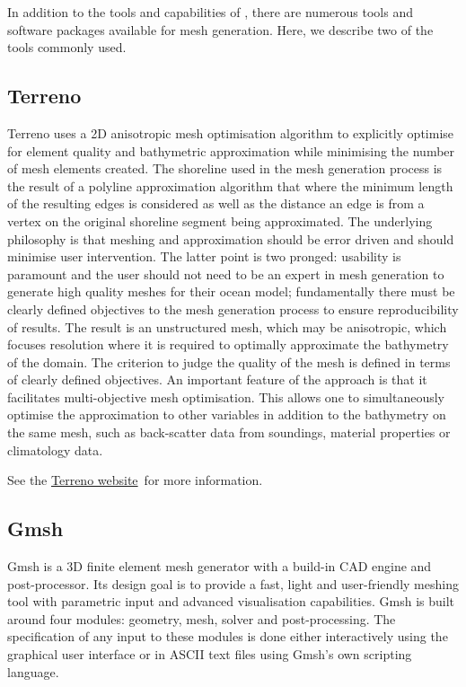 In addition to the tools and capabilities of \fluidity, there are numerous
tools and software packages available for mesh generation. Here, we describe 
two of the tools commonly used.

\subsection{Terreno}

Terreno uses a 2D anisotropic mesh optimisation algorithm to explicitly optimise for 
element quality and bathymetric approximation while minimising the number of mesh
elements created. The shoreline used in the mesh generation process is the result 
of a polyline approximation algorithm that where the minimum length of the resulting 
edges is considered as well as the distance an edge is from a vertex on the original 
shoreline segment being approximated. The underlying philosophy is that meshing and 
approximation should be error driven and should minimise user intervention. The 
latter point is two pronged: usability is paramount and the user should not need 
to be an expert in mesh generation to generate high quality meshes for their ocean 
model; fundamentally there must be clearly defined objectives to the mesh generation 
process to ensure reproducibility of results. The result is an unstructured mesh, 
which may be anisotropic, which focuses resolution where it is required to optimally 
approximate the bathymetry of the domain. The criterion to judge the quality of the 
mesh is defined in terms of clearly defined objectives. An important feature of the 
approach is that it facilitates multi-objective mesh optimisation. This allows one to 
simultaneously optimise the approximation to other variables in addition to the 
bathymetry on the same mesh, such as back-scatter data from soundings, material 
properties or climatology data. 

See the \href{http://amcg.ese.ic.ac.uk/terreno}{Terreno website}\ for more information.

\subsection{Gmsh}
\label{sec:meshing_tools_non_fluidity_gmsh}

Gmsh is a 3D finite element mesh generator with a build-in CAD engine and post-processor.
Its design goal is to provide a fast, light and user-friendly meshing tool with parametric
input and advanced visualisation capabilities. Gmsh is built around four modules: geometry, 
mesh, solver and post-processing. The specification of any input to these modules is done
either interactively using the graphical user interface or in ASCII text files using Gmsh's
own scripting language. 

